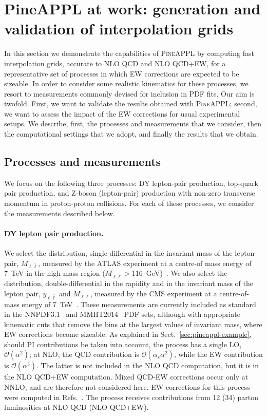 \section{PineAPPL at work: generation and validation of interpolation grids}
\label{sec:results}

In this section we demonstrate the capabilities of \textsc{PineAPPL} by
computing fast interpolation grids, accurate to NLO QCD and NLO QCD+EW,
for a representative set of processes in which EW corrections are expected 
to be sizeable. In order to consider some realistic kinematics for these
processes, we resort to measurements commonly devised for inclusion in PDF
fits. Our aim is twofold. First, we want to validate the results
obtained with \textsc{PineAPPL}; second, we want to assess the
impact of the EW corrections for usual experimental setups. We describe, first,
the processes and measurements that we consider, then the computational
settings that we adopt, and finally the results that we obtain.

\subsection{Processes and measurements}
\label{subsec:processes_and_measurements}

We focus on the following three processes: DY lepton-pair production, top-quark
pair production, and Z-boson (lepton-pair) production with non-zero transverse
momentum in proton-proton collisions. For each of these processes, we consider the measurements
described below.

\paragraph{DY lepton pair production.}
We select the distribution, single-differential in the invariant mass of the
lepton pair, $M_{\ell \bar\ell}$, measured by the ATLAS experiment at a centre-of
mass energy of 7~TeV in the high-mass region
($M_{\ell\bar\ell}>116$~GeV)~\cite{Aad:2013iua}.
We also select the distribution, double-differential in the rapidity and in
the invariant mass of the lepton pair, $y_{\ell\bar\ell}$ and $M_{\ell\bar\ell}$,
measured by the CMS experiment at a centre-of-mass energy of
7~TeV~\cite{Chatrchyan:2013tia}.
These measurements are currently included as standard in the
NNPDF3.1~\cite{Ball:2017nwa} and MMHT2014~\cite{Harland-Lang:2014zoa} PDF sets,
although with appropriate kinematic cuts that remove the bins at the largest
values of invariant mass, where EW corrections become sizeable. As explained in
Sect.~\ref{sec:pineappl-example}, should PI contributions be taken into account,
the process has a single LO, $\mathcal{O}(\alpha^2)$; at NLO, the
QCD contribution is $\mathcal{O}(\alpha_s\alpha^2)$, while the EW contribution
is $\mathcal{O}(\alpha^3)$. The latter is not included in the NLO
QCD computation, but it is in the NLO QCD+EW computation. Mixed QCD-EW
corrections occur only at NNLO, and are therefore not considered here.
EW corrections for this process were computed in
Refs.~\cite{Baur:2001ze,Dittmaier:2009cr}. The process receives contributions
from 12 (34) parton luminosities at NLO QCD (NLO QCD+EW).

